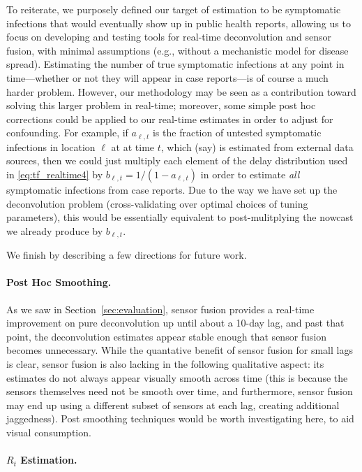\documentclass[sts]{imsart}
\def\hx{\hat{x}}
\def\hp{\hat{p}}
\theoremstyle{plain}
\theoremstyle{definition}
\theoremstyle{remark}
\begin{document}
To reiterate, we purposely defined our target of estimation to be symptomatic
infections that would eventually show up in public health reports, allowing us
to focus on developing and testing tools for real-time deconvolution and sensor
fusion, with minimal assumptions (e.g., without a mechanistic model for disease
spread). Estimating the number of true symptomatic infections at any point in
time---whether or not they will appear in case reports---is of course a much
harder problem. However, our methodology may be seen as a contribution toward
solving this larger problem in real-time; moreover, some simple post hoc
corrections could be applied to our real-time estimates in order to adjust for
confounding. For example, if $a_{\ell,t}$ is the fraction of untested
symptomatic infections in location $\ell$ at at time $t$, which (say) is
estimated from external data sources, then we could just multiply each element
\smash{$\hp^{(t)}_{\ell,s}$} of the delay distribution used in
\eqref{eq:tf_realtime4} by $b_{\ell,t}=1/(1-a_{\ell,t})$ in order to estimate
\emph{all} symptomatic infections from case reports. Due to the way we have set
up the deconvolution problem (cross-validating over optimal choices of tuning
parameters), this would be essentially equivalent to post-mulitplying the
nowcast \smash{$\hx^{(t)}_{\ell,s}$} we already produce by $b_{\ell,t}$.

We finish by describing a few directions for future work.

\smallskip
\paragraph*{Post Hoc Smoothing.}

As we saw in Section~\ref{sec:evaluation}, sensor fusion provides a real-time
improvement on pure deconvolution up until about a 10-day lag, and past that
point, the deconvolution estimates appear stable enough that sensor fusion
becomes unnecessary. While the quantative benefit of sensor fusion for small
lags is clear, sensor fusion is also lacking in the following qualitative
aspect: its estimates do not always appear visually smooth across time (this is
because the sensors themselves need not be smooth over time, and furthermore, 
sensor fusion may end up using a different subset of sensors at each lag,
creating additional jaggedness). Post smoothing techniques would be worth
investigating here, to aid visual consumption.

\smallskip
\paragraph*{$R_t$ Estimation.} 
\end{document}
